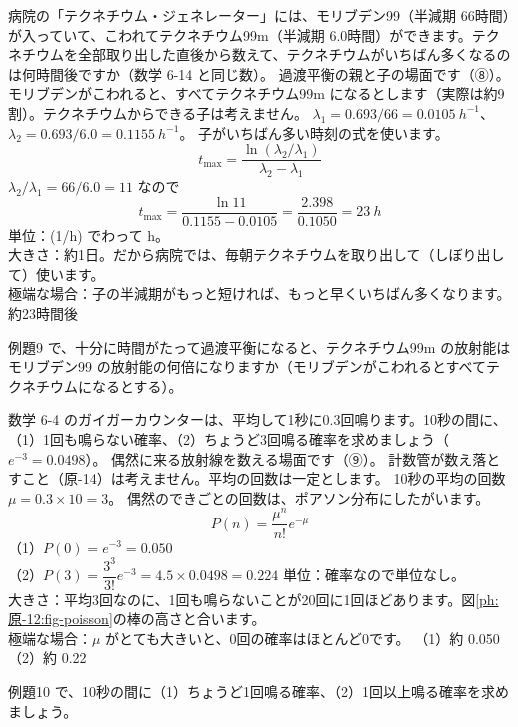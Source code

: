 \label{ph:原-12:ex9}
\begin{phreidai}[テクネチウムのジェネレーター]
病院の「テクネチウム・ジェネレーター」には、モリブデン99（半減期 66時間）が入っていて、こわれてテクネチウム99m（半減期 6.0時間）ができます。テクネチウムを全部取り出した直後から数えて、テクネチウムがいちばん多くなるのは何時間後ですか（数学 6-14 と同じ数）。
\phbamen
過渡平衡の親と子の場面です（⑧）。
\phmushi
モリブデンがこわれると、すべてテクネチウム99m になるとします（実際は約9割）。テクネチウムからできる子は考えません。
\phzu
$\lambda_1=0.693/66=\qty{0.0105}{h^{-1}}$、$\lambda_2=0.693/6.0=\qty{0.1155}{h^{-1}}$。
\phriyu
子がいちばん多い時刻の式を使います。
\phtateru
\[ t_{\max}=\frac{\ln(\lambda_2/\lambda_1)}{\lambda_2-\lambda_1} \]
\phtoku
$\lambda_2/\lambda_1=66/6.0=11$ なので
\[ t_{\max}=\frac{\ln11}{0.1155-0.0105}=\frac{2.398}{0.1050}=\qty{23}{h} \]
\phtashikame
単位：(1/h) でわって h。\\
大きさ：約1日。だから病院では、毎朝テクネチウムを取り出して（しぼり出して）使います。\\
極端な場合：子の半減期がもっと短ければ、もっと早くいちばん多くなります。
\kotae 約23時間後
\end{phreidai}
\begin{jibun}
例題9 で、十分に時間がたって過渡平衡になると、テクネチウム99m の放射能はモリブデン99 の放射能の何倍になりますか（モリブデンがこわれるとすべてテクネチウムになるとする）。
\end{jibun}

\label{ph:原-12:ex10}
\begin{phreidai}[ガイガーカウンターが鳴らない確率]
数学 6-4 のガイガーカウンターは、平均して1秒に0.3回鳴ります。10秒の間に、（1）1回も鳴らない確率、（2）ちょうど3回鳴る確率を求めましょう（$e^{-3}=0.0498$）。
\phbamen
偶然に来る放射線を数える場面です（⑨）。
\phmushi
計数管が数え落とすこと（原-14）は考えません。平均の回数は一定とします。
\phzu
10秒の平均の回数 $\mu=0.3\times10=3$。
\phriyu
偶然のできごとの回数は、ポアソン分布にしたがいます。
\phtateru
\[ P(n)=\frac{\mu^n}{n!}e^{-\mu} \]
\phtoku
（1）$P(0)=e^{-3}=0.050$\\
（2）$P(3)=\dfrac{3^3}{3!}e^{-3}=4.5\times0.0498=0.224$
\phtashikame
単位：確率なので単位なし。\\
大きさ：平均3回なのに、1回も鳴らないことが20回に1回ほどあります。図\ref{ph:原-12:fig-poisson}の棒の高さと合います。\\
極端な場合：$\mu$ がとても大きいと、0回の確率はほとんど0です。
\kotae （1）約 0.050　（2）約 0.22
\end{phreidai}
\begin{jibun}
例題10 で、10秒の間に（1）ちょうど1回鳴る確率、（2）1回以上鳴る確率を求めましょう。
\end{jibun}

